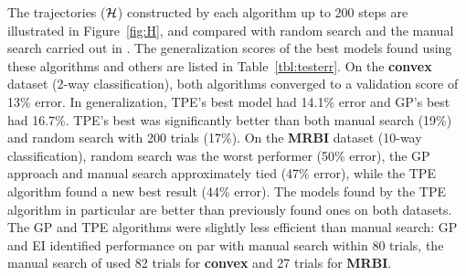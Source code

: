 \documentclass{article}
\renewcommand{\citet}{\cite}
\begin{document}
The trajectories (${\cal H}$) constructed by each algorithm up to 200 steps are
illustrated in Figure~\ref{fig:H},
and compared with random search and the manual search carried out in
\citet{Larochelle+etal:2007}.
The generalization scores of the best models found using these algorithms and others are listed in Table~\ref{tbl:testerr}.
On the {\bf convex} dataset (2-way classification), both algorithms converged
to a validation score of 13\% error.
In generalization, TPE's best model had 14.1\% error and GP's best had 16.7\%.
TPE's best was significantly better than both manual search (19\%) and random search with 200 trials (17\%).
On the {\bf MRBI} dataset (10-way classification), random search was the worst performer (50\%
error), the GP approach and manual search approximately tied (47\% error), while the
TPE algorithm found a new best result (44\% error).
The models found by the TPE algorithm in particular are better than previously
found ones on both datasets.
The GP and TPE algorithms were slightly less efficient than manual
search: GP and EI identified performance on par with manual search within
80 trials, the manual search of \cite{Larochelle+etal:2007} used 82 trials for
{\bf convex} and 27 trials for {\bf MRBI}.
\end{document}
